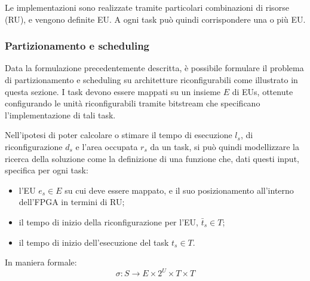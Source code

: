 Le implementazioni sono realizzate tramite particolari combinazioni di risorse (\ac{RU}),
e vengono definite \ac{EU}. A ogni task può quindi corrispondere una o più \ac{EU}.

\subsubsection{Partizionamento e scheduling}
Data la formulazione precedentemente descritta, è possibile formulare il problema
di partizionamento e scheduling su architetture riconfigurabili come illustrato in questa
sezione. I task devono essere mappati su un insieme $E$ di \acp{EU}, 
ottenute configurando le unità riconfigurabili tramite bitstream che specificano 
l'implementazione di tali task.

Nell'ipotesi di poter calcolare o stimare il tempo di esecuzione $l_{s}$, di 
riconfigurazione $d_{s}$ e l'area occupata $r_{s}$ da un task, si può quindi modellizzare 
la ricerca della soluzione come la definizione di una funzione 
che, dati questi input, specifica per ogni task:
\begin{itemize}
 \item l'\ac{EU} $e_s \in E$ su cui deve essere mappato, e il suo posizionamento 
all'interno dell'\ac{FPGA} in termini di \ac{RU};
 \item il tempo di inizio della riconfigurazione per l'\ac{EU}, $\bar{t}_s \in T$;
 \item il tempo di inizio dell'esecuzione del task $t_s \in T$.
\end{itemize}

In maniera formale:
\begin{equation}
\label{formula:mappingScheduling}
 \sigma : S \rightarrow E \times 2^{U} \times T \times T
\end{equation}

